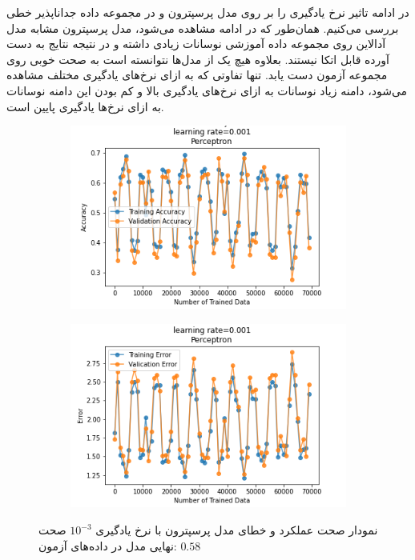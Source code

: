\documentclass[12pt, a4paper]{article}
\begin{document}
در ادامه تاثیر نرخ یادگیری را بر روی مدل پرسپترون و در مجموعه داده جداناپذیر خطی بررسی می‌کنیم.
همان‌طور که در ادامه مشاهده می‌شود، مدل پرسپترون مشابه مدل آدالاین روی مجموعه داده آموزشی نوسانات
زیادی داشته و در نتیجه نتایج به دست آورده قابل اتکا نیستند. بعلاوه هیچ یک از مدل‌ها نتوانسته است
به صحت خوبی روی مجموعه آزمون دست یابد. تنها تفاوتی که به ازای نرخ‌های یادگیری مختلف مشاهده می‌شود، دامنه
زیاد نوسانات به ازای نرخ‌های یادگیری بالا و کم بودن این دامنه نوسانات به ازای نرخ‌ها یادگیری پایین است.

\vspace{1cm}

\begin{figure}[h]
    \begin{subfigure}{0.45\linewidth}
        \centering
        \includegraphics[width=\linewidth]{images/5/perceptron/lr/acc_0.001.png}
    \end{subfigure}
    \hfil
    \begin{subfigure}{0.45\linewidth}
        \centering
        \includegraphics[width=\linewidth]{images/5/perceptron/lr/error_0.001.png}
    \end{subfigure}
    \caption{نمودار صحت عملکرد‌ و خطای مدل پرسپترون با نرخ یادگیری $10^{-3}$
    \newline
    صحت نهایی مدل در داده‌های آزمون: $0.58$}
\end{figure}
\end{document}
